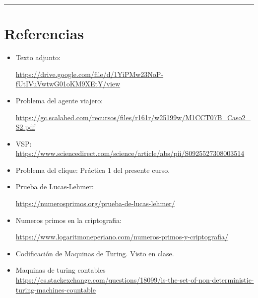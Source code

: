 \documentclass[12pt,letterpaper]{article}
\newcommand{\lineaxd}{{\color{brown}\rule{\linewidth}{0.5mm}}}
\begin{document}
\lineaxd

\section*{Referencias}

\begin{itemize}
    \item Texto adjunto:

\url{https://drive.google.com/file/d/1YiPMw23NoP-fUtIVuVwtwG01oKM9XEtY/view}

    \item Problema del agente viajero:

\url{https://gc.scalahed.com/recursos/files/r161r/w25199w/M1CCT07B_Caso2_S2.pdf}

    \item VSP:
\url{https://www.sciencedirect.com/science/article/abs/pii/S0925527308003514}

    \item Problema del clique: Práctica 1 del presente curso.

    \item Prueba de Lucas-Lehmer:

\url{https://numerosprimos.org/prueba-de-lucas-lehmer/}

    \item Numeros primos en la criptografia:

\url{https://www.logaritmoneperiano.com/numeros-primos-y-criptografia/}

    \item Codificación de Maquinas de Turing. Visto en clase.

    \item Maquinas de turing contables
\url{https://cs.stackexchange.com/questions/18099/is-the-set-of-non-deterministic-turing-machines-countable}

\end{itemize}
\end{document}
